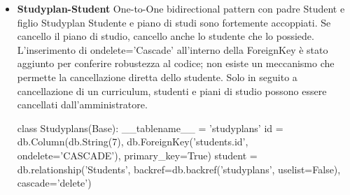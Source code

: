 \documentclass{article}
\begin{document}
\begin{itemize}
\item \textbf{Studyplan-Student} One-to-One bidirectional pattern con padre Student e figlio Studyplan
Studente e piano di studi sono fortemente accoppiati. Se cancello il piano di studio, cancello anche lo studente che lo possiede.
L'inserimento di ondelete='Cascade' all'interno della ForeignKey è stato aggiunto per conferire robustezza al codice; non esiste un meccanismo che permette la cancellazione  diretta dello studente. Solo in seguito a cancellazione di un curriculum, studenti e piani di studio possono essere cancellati dall'amministratore.
\begin{python}
class Studyplans(Base):
    __tablename__ = 'studyplans'
    id = db.Column(db.String(7), db.ForeignKey('students.id', ondelete='CASCADE'), primary_key=True)
    student = db.relationship('Students', backref=db.backref('studyplans', uselist=False), cascade='delete')
\end{python}
\end{itemize}
\newpage
\end{document}
